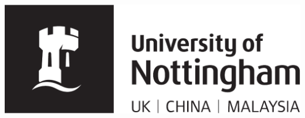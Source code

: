 


\pagestyle{empty}
\begin{addmargin}[-1cm]{-3cm}
\begin{center}
    \large

    \hfill

    \vfill

        \href{https://www.nottingham.ac.uk/}{\includegraphics[width=.5\textwidth]{Graphics/0-FrontBackMatter/UoN-Logo.pdf}}

    \vfill

\end{center}
\end{addmargin}


